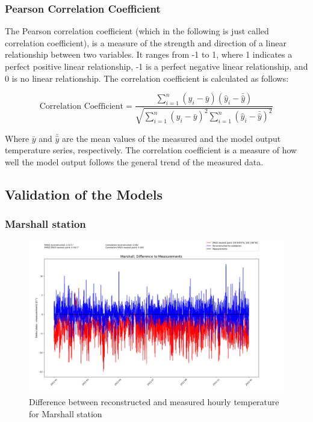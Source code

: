 \subsubsection*{Pearson Correlation Coefficient}

The Pearson correlation coefficient (which in the following is just called correlation coefficient), is a measure of the strength and direction of a linear relationship between two variables.
It ranges from -1 to 1, where 1 indicates a perfect positive linear relationship, -1 is a perfect negative linear relationship, and 0 is no linear relationship. The correlation coefficient is calculated as follows:

\begin{equation}
    \text{Correlation Coefficient} = \frac{\sum_{i=1}^{n} (y_i - \bar{y})(\hat{y}_i - \bar{\hat{y}})}{\sqrt{\sum_{i=1}^{n} (y_i - \bar{y})^2 \sum_{i=1}^{n} (\hat{y}_i - \bar{\hat{y}})^2}}
    \label{eq: correlation}
\end{equation}
    
Where $\bar{y}$ and $\bar{\hat{y}}$ are the mean values of the measured and the model output temperature series, respectively.
The correlation coefficient is a measure of how well the model output follows the general trend of the measured data. \cite{Zou2003Correlation}

\subsection{Validation of the Models}

\subsubsection*{Marshall station}

\begin{figure}
    \centering
    \includegraphics[width=1.00\textwidth]{resources/images/charts/marshall_eval_grib_final/Marshall, Difference to Measurements.png}
    \caption{Difference between reconstructed and measured hourly temperature for Marshall station}
    \label{fig: marshall_diff}
\end{figure}

